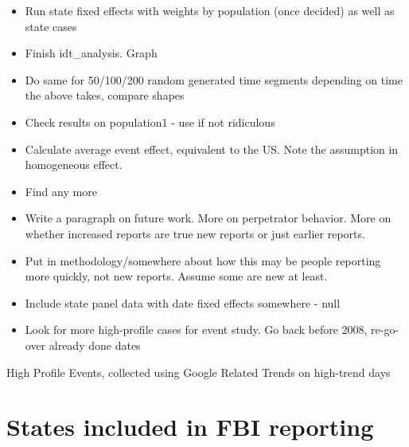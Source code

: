 \documentclass[AER,draftmode]{AEA}
\begin{document}
\begin{itemize}
    \item Run state fixed effects with weights by population (once decided) as well as state cases
    \item Finish idt\_analysis. Graph
    \item Do same for 50/100/200 random generated time segments depending on time the above takes, compare shapes
    \item Check results on population1 - use if not ridiculous
    \item Calculate average event effect, equivalent to the US. Note the assumption in homogeneous effect.
    \item Find any more 
    \item Write a paragraph on future work. More on perpetrator behavior. More on whether increased reports are true new reports or just earlier reports.
    \item Put in methodology/somewhere about how this may be people reporting more quickly, not new reports. Assume some are new at least.
    \item Include state panel data with date fixed effects somewhere - null
    \item Look for more high-profile cases for event study. Go back before 2008, re-go-over already done dates
\end{itemize}


\clearpage




\clearpage
\appendix

\begin{table}[]
\caption{High Profile Events, collected using Google Related Trends on high-trend days}

\end{table}

\clearpage
\chapter{States included in FBI reporting}
\end{document}
